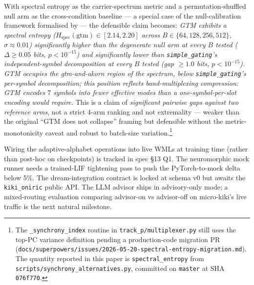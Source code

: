 \documentclass[10pt,twocolumn]{article}
\begin{document}
With spectral entropy as the carrier-spectrum metric and a
permutation-shuffled null arm as the cross-condition baseline ---
a special case of the null-calibration framework formalised by
\cite{aristotelianprh2026} --- the defensible claim becomes:
\emph{GTM exhibits a spectral entropy
($H_{\text{spec}}(\text{gtm}) \in [2.14, 2.20]$ across
$B \in \{64,128,256,512\}$, $\sigma \approx 0.01$)
significantly higher than the degenerate null arm at every $B$ tested
($\Delta \geq 0.05$ bits, $p < 10^{-15}$) and significantly lower than
\texttt{simple\_gating}'s independent-symbol decomposition at every $B$
tested (gap $\geq 1.0$ bits, $p < 10^{-15}$). GTM occupies the
gtm-and-akorn region of the spectrum, below \texttt{simple\_gating}'s
per-symbol decomposition; this position reflects band-multiplexing
compression: GTM encodes $7$ symbols into fewer effective modes than
a one-symbol-per-slot encoding would require.} This is a claim of
\emph{significant pairwise gaps against two reference arms}, not a
strict 4-arm ranking and not extremality --- weaker than the original
``GTM does not collapse'' framing but defensible without the
metric-monotonicity caveat and robust to batch-size variation.\footnote{%
The \texttt{\_synchrony\_index} routine in
\texttt{track\_p/multiplexer.py} still uses the top-PC variance
definition pending a production-code migration PR
(\texttt{docs/superpowers/issues/2026-05-20-spectral-entropy-migration.md}).
The quantity reported in this paper is \texttt{spectral\_entropy}
from \texttt{scripts/synchrony\_alternatives.py}, committed on
\texttt{master} at SHA \texttt{076f770}.}

Wiring the adaptive-alphabet operations into live WMLs at training
time (rather than post-hoc on checkpoints) is tracked in spec \S 13
Q1. The neuromorphic mock runner needs a trained-LIF tightening pass
to push the PyTorch-to-mock delta below 5\%. The dream-integration
contract is locked at schema v0 but awaits the \texttt{kiki\_oniric}
public API. The LLM advisor ships in advisory-only mode; a mixed-routing
evaluation comparing advisor-on vs advisor-off on micro-kiki's live
traffic is the next natural milestone.



\end{document}
